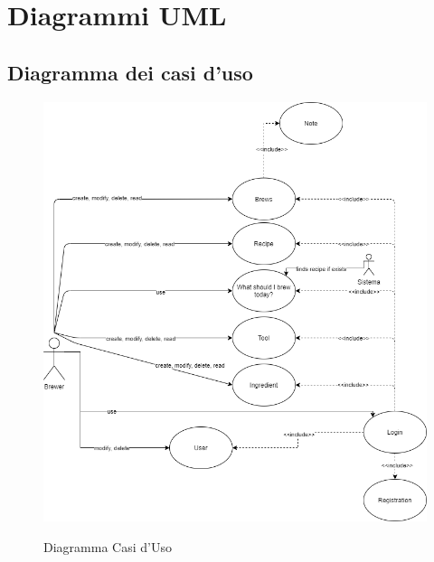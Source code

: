 \documentclass{article}
\begin{document}
\section{Diagrammi UML}
\subsection{Diagramma dei casi d'uso}
\begin{figure}[h!]
\centering
\includegraphics[scale=0.5]{Diagramma casi d'uso.png}
\label{fig:Diagramma Casi d'Uso}
\caption{Diagramma Casi d'Uso}
\end{figure}
\clearpage
\end{document}
